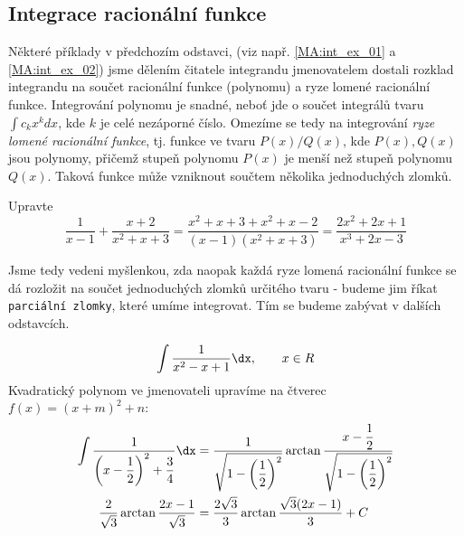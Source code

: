    \subsection{Integrace racionální funkce}
      Některé příklady v předchozím odstavci, (viz např. \ref{MA:int_ex_01} a 
      \ref{MA:int_ex_02}) jsme dělením čitatele integrandu jmenovatelem dostali rozklad
      integrandu na součet racionální funkce (polynomu) a ryze lomené racionální funkce.
      Integrování polynomu je snadné, neboť jde o součet integrálů tvaru $\int c_kx^k dx$, kde
      $k$ je celé nezáporné číslo. Omezíme se tedy na integrování \emph{ryze lomené racionální
      funkce},  tj. funkce ve tvaru $P(x)/Q(x)$, kde $P(x), Q(x)$ jsou polynomy, přičemž stupeň
      polynomu $P(x)$ je menší než stupeň polynomu $Q(x)$. Taková funkce může vzniknout součtem
      několika jednoduchých zlomků.
      
      \begin{example}
        Upravte
        \footnotesize\begin{equation*}
          \frac{1}{x-1}+\frac{x+2}{x^2+x+3} 
             = \frac{x^2+x+3+x^2+x-2}{(x-1)(x^2+x+3)}              
             = \frac{2x^2+2x+1}{x^3+2x-3}
        \end{equation*}          
      \end{example}
      
      Jsme tedy vedeni myšlenkou, zda naopak každá ryze lomená racionální funkce se dá rozložit
      na součet jednoduchých zlomků určitého tvaru - budeme jim říkat \texttt{parciální zlomky},
      které umíme integrovat. Tím se budeme zabývat v dalších odstavcích. 
            
      \begin{example}
        \begin{equation}
          \int\frac{1}{x^2 - x + 1}\dx, \qquad x\in R
        \end{equation}
        Kvadratický polynom ve jmenovateli upravíme na čtverec $f(x) = (x + m)^2 + n$:
        \begin{align*}
          \int\dfrac{1}{\left(x-\dfrac{1}{2}\right)^2+\dfrac{3}{4}}\dx   &=
            \dfrac{1}{\sqrt{1-\left(\dfrac{1}{2}\right)^2}}\arctan
            \dfrac{x-\dfrac{1}{2}}{\sqrt{1-\left(\dfrac{1}{2}\right)^2}}                       \\
          \dfrac{2}{\sqrt{3}}\arctan\dfrac{2x-1}{\sqrt{3}}               &=
            \dfrac{2\sqrt{3}}{3}\arctan\dfrac{\sqrt{3}(2x-1)}{3} + C
        \end{align*}
      \end{example}     
      
